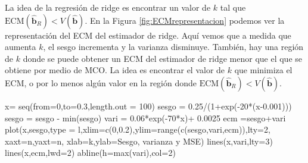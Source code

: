 \documentclass[
]{article}
\newenvironment{Shaded}{\begin{snugshade}}{\end{snugshade}}
\newcommand{\AttributeTok}[1]{\textcolor[rgb]{0.77,0.63,0.00}{#1}}
\newcommand{\DecValTok}[1]{\textcolor[rgb]{0.00,0.00,0.81}{#1}}
\newcommand{\FloatTok}[1]{\textcolor[rgb]{0.00,0.00,0.81}{#1}}
\newcommand{\FunctionTok}[1]{\textcolor[rgb]{0.00,0.00,0.00}{#1}}
\newcommand{\NormalTok}[1]{#1}
\newcommand{\OtherTok}[1]{\textcolor[rgb]{0.56,0.35,0.01}{#1}}
\newcommand{\SpecialCharTok}[1]{\textcolor[rgb]{0.00,0.00,0.00}{#1}}
\newcommand{\StringTok}[1]{\textcolor[rgb]{0.31,0.60,0.02}{#1}}
\begin{document}
La idea de la regresión de ridge es encontrar un valor de \(k\) tal que \(\mbox{ECM}(\widehat{\boldsymbol b}_{R}) < V(\widehat{\boldsymbol b})\). En la Figura \ref{fig:ECMrepresentacion} podemos ver la representación del ECM del estimador de ridge. Aquí vemos que a medida que aumenta \(k\), el sesgo incrementa y la varianza disminuye. También, hay una región de \(k\) donde se puede obtener un ECM del estimador de ridge menor que el que se obtiene por medio de MCO. La idea es encontrar el valor de \(k\) que minimiza el ECM, o por lo menos algún valor en la región donde \(\mbox{ECM}(\widehat{\boldsymbol b}_{R}) < V(\widehat{\boldsymbol b})\).

\begin{Shaded}
\begin{Highlighting}[]
\NormalTok{x}\OtherTok{=} \FunctionTok{seq}\NormalTok{(}\AttributeTok{from=}\DecValTok{0}\NormalTok{,}\AttributeTok{to=}\FloatTok{0.3}\NormalTok{,}\AttributeTok{length.out =} \DecValTok{100}\NormalTok{)}
\NormalTok{sesgo }\OtherTok{=} \FloatTok{0.25}\SpecialCharTok{/}\NormalTok{(}\DecValTok{1}\SpecialCharTok{+}\FunctionTok{exp}\NormalTok{(}\SpecialCharTok{{-}}\DecValTok{20}\SpecialCharTok{*}\NormalTok{(x}\FloatTok{{-}0.001}\NormalTok{)))}
\NormalTok{sesgo }\OtherTok{=}\NormalTok{ sesgo }\SpecialCharTok{{-}} \FunctionTok{min}\NormalTok{(sesgo) }
\NormalTok{vari }\OtherTok{=} \FloatTok{0.06}\SpecialCharTok{*}\FunctionTok{exp}\NormalTok{(}\SpecialCharTok{{-}}\DecValTok{70}\SpecialCharTok{*}\NormalTok{x)}\SpecialCharTok{+} \FloatTok{0.0025}
\NormalTok{ecm }\OtherTok{=}\NormalTok{sesgo}\SpecialCharTok{+}\NormalTok{vari}
\FunctionTok{plot}\NormalTok{(x,sesgo,}\AttributeTok{type =} \StringTok{\textquotesingle{}l\textquotesingle{}}\NormalTok{,}\AttributeTok{xlim=}\FunctionTok{c}\NormalTok{(}\DecValTok{0}\NormalTok{,}\FloatTok{0.2}\NormalTok{),}\AttributeTok{ylim=}\FunctionTok{range}\NormalTok{(}\FunctionTok{c}\NormalTok{(sesgo,vari,ecm)),}\AttributeTok{lty=}\DecValTok{2}\NormalTok{, }\AttributeTok{xaxt=}\StringTok{\textquotesingle{}n\textquotesingle{}}\NormalTok{,}\AttributeTok{yaxt=}\StringTok{\textquotesingle{}n\textquotesingle{}}\NormalTok{,}
     \AttributeTok{xlab=}\StringTok{\textquotesingle{}k\textquotesingle{}}\NormalTok{,}\AttributeTok{ylab=}\StringTok{\textquotesingle{}Sesgo, varianza y MSE\textquotesingle{}}\NormalTok{)}
\FunctionTok{lines}\NormalTok{(x,vari,}\AttributeTok{lty=}\DecValTok{3}\NormalTok{)}
\FunctionTok{lines}\NormalTok{(x,ecm,}\AttributeTok{lwd=}\DecValTok{2}\NormalTok{)}
\FunctionTok{abline}\NormalTok{(}\AttributeTok{h=}\FunctionTok{max}\NormalTok{(vari),}\AttributeTok{col=}\DecValTok{2}\NormalTok{)}

\end{Highlighting}
\end{Shaded}
\end{document}
